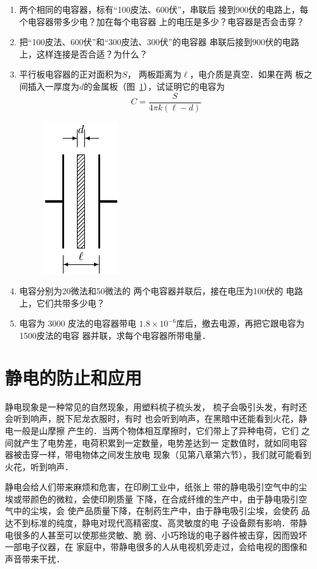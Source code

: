\begin{enumerate}
\item 两个相同的电容器，标有“100皮法、600伏”，串联后
接到900伏的电路上，每个电容器带多少电？加在每个电容器
上的电压是多少？电容器是否会击穿？
\item 把“100皮法、600伏”和“300皮法、300伏”的电容器
串联后接到900伏的电路上，这样连接是否合适？为什么？
\item 平行板电容器的正对面积为$S$，
两板距离为$\ell$，电介质是真空．如果在两
板之间插入一厚度为$d$的金属板（图~\ref{fig_B_6-42}），试证明它的电容为
\[C=\frac{S}{4\pi k(\ell-d)}\]
\begin{figure}[htbp]
    \centering
    \includegraphics{fig/B/6-42.pdf}
    \caption{}\label{fig_B_6-42}
\end{figure}
\item 电容分别为20微法和50微法的
两个电容器并联后，接在电压为100伏的
电路上，它们共带多少电？
\item 电容为 3000 皮法的电容器带电
$1.8\times10^{-6}$库后，撤去电源，再把它跟电容为1500皮法的电容
器并联，求每个电容器所带电量．
\end{enumerate}

\section{静电的防止和应用}
静电现象是一种常见的自然现象，用塑料梳子梳头发，
梳子会吸引头发，有时还会听到响声，脱下尼龙衣服时，有时
也会听到响声，在黑暗中还能看到火花，静电一般是山摩擦
产生的．当两个物体相互摩擦时，它们带上了异种电荷，它们
之间就产生了电势差，电荷积累到一定数量，电势差达到一
定数值时，就如同电容器被击穿一样，带电物体之间发生放电
现象（见第八章第六节），我们就可能看到火花，听到响声．

静电会给人们带来麻烦和危害，在印刷工业中，纸张上
带的静电吸引空气中的尘埃或带颜色的微粒，会使印刷质量
下降，在合成纤维的生产中，由于静电吸引空气中的尘埃，会
使产品质量下降，在制药生产中，由于静电吸引尘埃，会使药
品达不到标准的纯度，静电对现代高精密度、高灵敏度的电
子设备颇有影响．带静电很多的人甚至可以使那些灵敏、脆
弱、小巧玲珑的电子器件被击穿，因而毁坏一部电子仪器，在
家庭中，带静电很多的人从电视机旁走过，会给电视的图像和
声音带来干扰．

